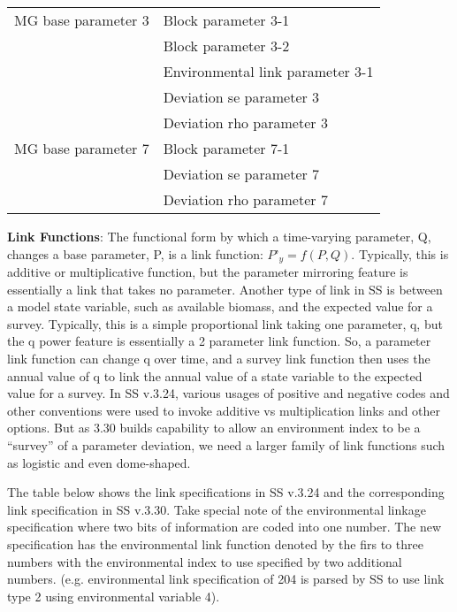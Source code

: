  \begin{center}
 	\begin{longtable}{p{5cm} p{10cm}}
	 	\hline
	 	MG base parameter 3 & Block parameter 3-1\\
	 	                    & Block parameter 3-2\\
	 	                    & Environmental link parameter 3-1\\
	 	                    & Deviation se parameter 3 \\
	 	                    & Deviation rho parameter 3 \\
		MG base parameter 7 & Block parameter 7-1 \\
							& Deviation se parameter 7 \\
							& Deviation rho parameter 7 \\
		\hline	 	                    
	 	       
 	\end{longtable}
 \end{center}
 
\noindent \textbf{Link Functions}:  The functional form by which a time-varying parameter, Q, changes a base parameter, P, is a link function:  $P’_y=f(P,Q)$.  Typically, this is additive or multiplicative function, but the parameter mirroring feature is essentially a link that takes no parameter.  Another type of link in SS is between a model state variable, such as available biomass, and the expected value for a survey.  Typically, this is a simple proportional link taking one parameter, q, but the q power feature is essentially a 2 parameter link function.  So, a parameter link function can change q over time, and a survey link function then uses the annual value of q to link the annual value of a state variable to the expected value for a survey.  In SS v.3.24, various usages of positive and negative codes and other conventions were used to invoke additive vs multiplication links and other options.  But as 3.30 builds capability to allow an environment index to be a “survey” of a parameter deviation, we need a larger family of link functions such as logistic and even dome-shaped.

The table below shows the link specifications in SS v.3.24 and the corresponding link specification in SS v.3.30.  Take special note of the environmental linkage specification where two bits of information are coded into one number.  The new specification has the environmental link function denoted by the firs to three numbers with the environmental index to use specified by two additional numbers. (e.g. environmental link specification of 204 is parsed by SS to use link type 2 using environmental variable 4).

